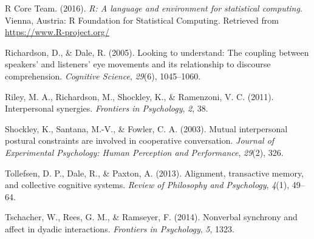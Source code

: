 \documentclass[10pt, letterpaper]{article}
\begin{document}
\hypertarget{ref-r2016r}{}
R Core Team. (2016). \emph{R: A language and environment for statistical
computing}. Vienna, Austria: R Foundation for Statistical Computing.
Retrieved from \url{https://www.R-project.org/}

\hypertarget{ref-richardson2005looking}{}
Richardson, D., \& Dale, R. (2005). Looking to understand: The coupling
between speakers' and listeners' eye movements and its relationship to
discourse comprehension. \emph{Cognitive Science}, \emph{29}(6),
1045--1060.

\hypertarget{ref-riley2011interpersonal}{}
Riley, M. A., Richardson, M., Shockley, K., \& Ramenzoni, V. C. (2011).
Interpersonal synergies. \emph{Frontiers in Psychology}, \emph{2}, 38.

\hypertarget{ref-shockley2003mutual}{}
Shockley, K., Santana, M.-V., \& Fowler, C. A. (2003). Mutual
interpersonal postural constraints are involved in cooperative
conversation. \emph{Journal of Experimental Psychology: Human Perception
and Performance}, \emph{29}(2), 326.

\hypertarget{ref-tollefsen2013alignment}{}
Tollefsen, D. P., Dale, R., \& Paxton, A. (2013). Alignment, transactive
memory, and collective cognitive systems. \emph{Review of Philosophy and
Psychology}, \emph{4}(1), 49--64.

\hypertarget{ref-tschacher2014nonverbal}{}
Tschacher, W., Rees, G. M., \& Ramseyer, F. (2014). Nonverbal synchrony
and affect in dyadic interactions. \emph{Frontiers in Psychology},
\emph{5}, 1323.
\end{document}
